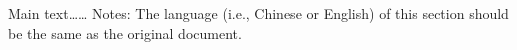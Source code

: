
\begin{comments}

Main text…… Notes: The language (i.e., Chinese or English) of this section should be the same as the original document.

\end{comments}
